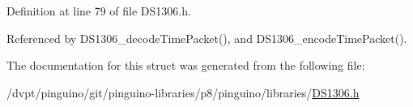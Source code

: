 Definition at line 79 of file D\-S1306.\-h.



Referenced by D\-S1306\-\_\-decode\-Time\-Packet(), and D\-S1306\-\_\-encode\-Time\-Packet().



The documentation for this struct was generated from the following file\-:\begin{DoxyCompactItemize}
\item 
/dvpt/pinguino/git/pinguino-\/libraries/p8/pinguino/libraries/\hyperlink{p8_2pinguino_2libraries_2_d_s1306_8h}{D\-S1306.\-h}\end{DoxyCompactItemize}
